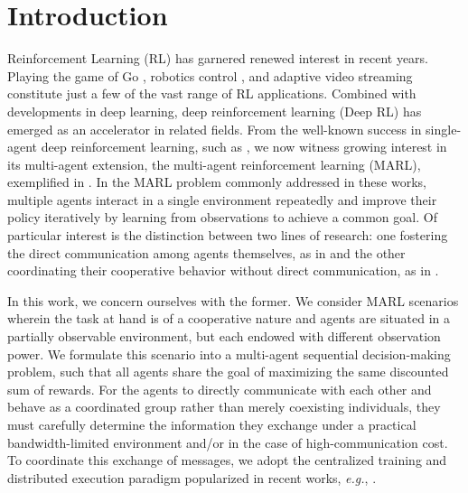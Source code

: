 \section{Introduction}
\label{sec:intro}
Reinforcement Learning (RL) has garnered renewed interest in recent
years.  Playing the game of Go \citep{dqn}, robotics control
\citep{robot,ddpg}, and adaptive video streaming \citep{pensieve}
constitute just a few of the vast range of RL applications. Combined
with developments in deep learning, deep reinforcement learning (Deep
RL) has emerged as an accelerator in related fields. From the
well-known success in single-agent deep reinforcement learning, such
as \citet{dqn}, we now witness growing interest in its multi-agent
extension, the multi-agent reinforcement learning (MARL), exemplified
in \citet{gupta2017cooperative,lowe2017multi,coma,omidshafiei2017deep,
  dial, commnet, mordatch2017grounded,havrylov2017,lenient,bicnet,
  lola, tampuu2017multiagent, leibo2017multi,foerster2017stabilising}.
In the MARL problem commonly addressed in these works, multiple agents
interact in a single environment repeatedly and improve their policy
iteratively by learning from observations to achieve a common goal.
Of particular interest is the distinction between two lines of
research: one fostering the direct communication among agents
themselves, as in \citet{dial,commnet} and the other coordinating their
cooperative behavior without direct communication, as in
\citet{foerster2017stabilising,lenient,leibo2017multi}.

In this work, we concern ourselves with the former. We consider MARL
scenarios wherein the task at hand is of a cooperative nature and
agents are situated in a partially observable environment, but each
endowed with different observation power.  We formulate this scenario
into a multi-agent sequential decision-making problem, such that all
agents share the goal of maximizing the same discounted sum of
rewards. For the agents to directly communicate with each other and
behave as a coordinated group rather than merely coexisting
individuals, they must carefully determine the information they
exchange under a practical bandwidth-limited environment and/or in the case
of high-communication cost. To coordinate this exchange of messages,
we adopt the centralized training and distributed execution paradigm
popularized in recent works, {\em e.g.}, \citet{coma, lowe2017multi, vdn,
  qmix, gupta2017cooperative}.

